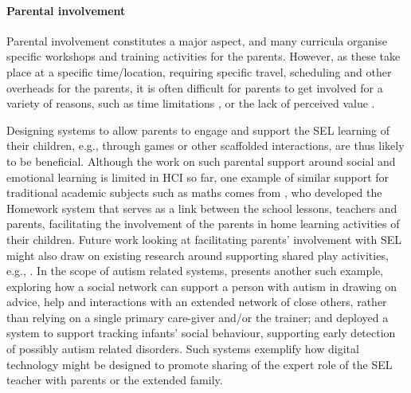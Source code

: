 \documentclass[prodmode,acmtochi]{acmsmall}
\begin{document}
\paragraph{Parental involvement}				Parental involvement  constitutes a major aspect, and many curricula organise specific workshops and training activities for the parents. However, as these take place at a specific time/location, requiring specific travel, scheduling and other overheads for the parents, it is often difficult for parents to get involved for a variety of reasons, such as time limitations \cite{Bender2011}, or the lack of perceived value \cite{Lewin2010}. 

Designing systems to allow parents to engage and support the SEL learning of their children, e.g., through games or other scaffolded interactions, are thus likely to be beneficial. Although the work on such parental support around social and emotional learning is limited in HCI so far,  one example of similar support for traditional academic subjects such as maths comes from , who developed the Homework system that serves as a link between the school lessons, teachers and parents, facilitating the involvement of the parents in home learning activities of their children. Future work looking at facilitating parents' involvement with SEL might also draw on existing research around supporting shared play activities, e.g., \cite{Raffle2010}. In the scope of autism related systems,  presents another such example, exploring how a social network can support a person with autism in drawing on advice, help and interactions with an extended network of close others, rather than relying on a single primary care-giver and/or the trainer; and  deployed a system to support tracking infants' social behaviour, supporting early detection of possibly autism related disorders. Such systems exemplify how digital technology might be designed to promote sharing of the expert role of the SEL teacher with parents or the extended family. 

\end{document}
